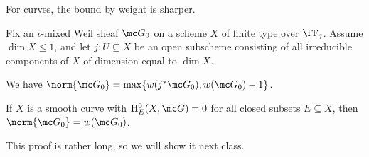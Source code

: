 \documentclass[../notes.tex]{subfiles}
\begin{document}
For curves, the bound by weight is sharper.
\begin{theorem}
	Fix an $\iota$-mixed Weil sheaf $\mc G_0$ on a scheme $X$ of finite type over $\FF_q$. Assume $\dim X\le1$, and let $j\colon U\subseteq X$ be an open subscheme consisting of all irreducible components of $X$ of dimension equal to $\dim X$.
	\begin{listalph}
		\item We have $\norm{\mc G_0}=\max\{w(j^*\mc G_0),w(\mc G_0)-1\}$.
		\item If $X$ is a smooth curve with $\mathrm H^0_E(X,\mc G)=0$ for all closed subsets $E\subseteq X$, then $\norm{\mc G_0}=w(\mc G_0)$.
	\end{listalph}
\end{theorem}
This proof is rather long, so we will show it next class.
\end{document}
